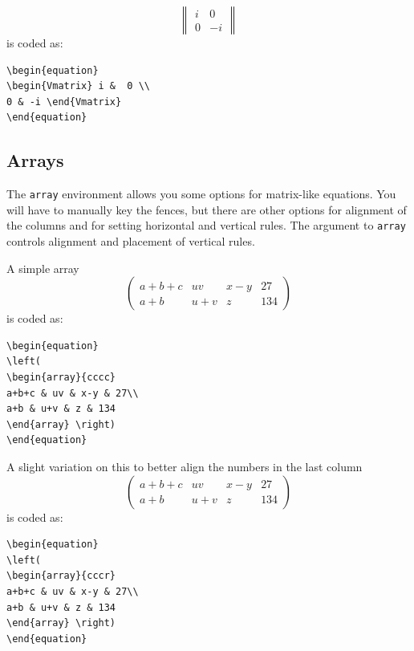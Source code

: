 \documentclass[lettersize,journal]{IEEEtran}
\begin{document}
\begin{equation}
\begin{Vmatrix} i &  0 \\
0 & -i \end{Vmatrix}
\end{equation}
is coded as:
\begin{verbatim}
\begin{equation}
\begin{Vmatrix} i &  0 \\
0 & -i \end{Vmatrix}
\end{equation}\end{verbatim}

\subsection{Arrays}
The {\tt{array}} environment allows you some options for matrix-like equations. You will have to manually key the fences, but there are other options for alignment of the columns and for setting horizontal and vertical rules. The argument to {\tt{array}} controls alignment and placement of vertical rules.

A simple array
\begin{equation}
\left(
\begin{array}{cccc}
a+b+c & uv & x-y & 27\\
a+b & u+v & z & 134
\end{array}\right)
\end{equation}
is coded as:
\begin{verbatim}
\begin{equation}
\left(
\begin{array}{cccc}
a+b+c & uv & x-y & 27\\
a+b & u+v & z & 134
\end{array} \right)
\end{equation}
\end{verbatim}

A slight variation on this to better align the numbers in the last column
\begin{equation}
\left(
\begin{array}{cccr}
a+b+c & uv & x-y & 27\\
a+b & u+v & z & 134
\end{array}\right)
\end{equation}
is coded as:
\begin{verbatim}
\begin{equation}
\left(
\begin{array}{cccr}
a+b+c & uv & x-y & 27\\
a+b & u+v & z & 134
\end{array} \right)
\end{equation}
\end{verbatim}
\end{document}
